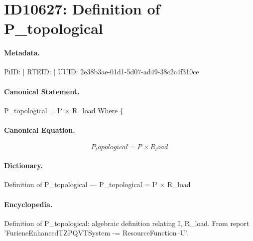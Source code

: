 \section*{ID10627: Definition of P\_topological}
\paragraph{Metadata.}
PiID:  | RTEID:  | UUID: 2e38b3ae-01d1-5d07-ad49-38c2c4f310ce

\paragraph{Canonical Statement.}
P\_topological = I² × R\_load Where \{

\paragraph{Canonical Equation.}
\[
P_topological = I² × R_load
\]

\paragraph{Dictionary.}
Definition of P\_topological — P\_topological = I² × R\_load

\paragraph{Encyclopedia.}
Definition of P\_topological: algebraic definition relating I, R\_load. From report 'FurieneEnhancedTZPQVTSystem -= ResourceFunction--U'.
